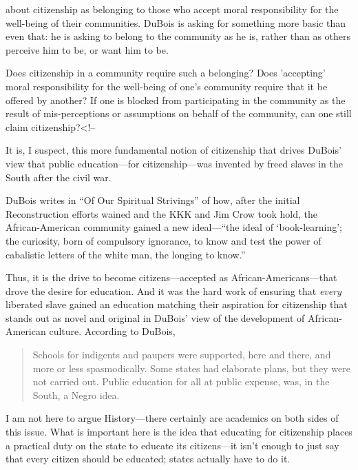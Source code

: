  about citizenship as belonging to those who accept moral responsibility for the well-being of their communities. DuBois is asking for something more basic than even that: he is asking to belong to the community as he is, rather than as others perceive him to be, or want him to be. \begin{question}Does citizenship in a community require such a belonging? Does 'accepting' moral responsibility for the well-being of one's community require that it be offered by another?  If one is blocked from participating in the community as the result of mis-perceptions or assumptions on behalf of the community, can one still claim citizenship?<!--\end{question}

It is, I suspect, this more fundamental notion of citizenship that drives DuBois' view that public education---for citizenship---was invented by freed slaves in the South after the civil war. 

DuBois writes in ``Of Our Spiritual Strivings'' of how, after the initial Reconstruction efforts wained and the KKK and Jim Crow took hold, the African-American community gained a new ideal---``the ideal of `book-learning'; the curiosity, born of compulsory ignorance, to know and test the power of cabalistic letters of the white man, the longing to know.'' ~\citep[p .5]{DuBois:1994ui}

Thus, it is the drive to become citizens---accepted as African-Americans---that drove the desire for education. And it was the hard work of ensuring that \emph{every} liberated slave gained an education matching their aspiration for citizenship that stands out as novel and original in DuBois' view of the development of African-American culture. According to DuBois, 

\begin{quote}

Schools for indigents and paupers were supported, here and there,
and more or less spasmodically. Some states had elaborate plans, but
they were not carried out. Public education for all at public expense,
was, in the South, a Negro idea. ~\citep[P. 638]{DuBois:AhpSm-WI}
\end{quote}

I am not here to argue History---there certainly are academics on both sides of this issue. What is important here is the idea that educating for citizenship places a practical duty on the state to educate its citizens---it isn't enough to just say that every citizen should be educated; states actually have to do it.

